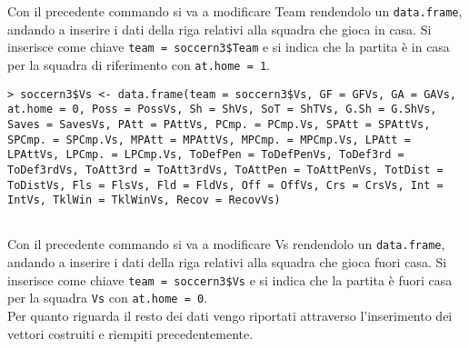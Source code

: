 \bigskip
Con il precedente commando si va a modificare \textsf{Team} rendendolo un \texttt{data.frame}, andando a inserire i dati della riga relativi alla squadra che gioca in casa. Si inserisce come chiave \texttt{team = soccern3\$Team} e si indica che la partita è in casa per la squadra di riferimento con \texttt{at.home = 1}.
\bigskip
\bigskip
\begin{lstlisting}
> soccern3$Vs <- data.frame(team = soccern3$Vs, GF = GFVs, GA = GAVs, at.home = 0, Poss = PossVs, Sh = ShVs, SoT = ShTVs, G.Sh = G.ShVs, Saves = SavesVs, PAtt = PAttVs, PCmp. = PCmp.Vs, SPAtt = SPAttVs, SPCmp. = SPCmp.Vs, MPAtt = MPAttVs, MPCmp. = MPCmp.Vs, LPAtt = LPAttVs, LPCmp. = LPCmp.Vs, ToDefPen = ToDefPenVs, ToDef3rd = ToDef3rdVs, ToAtt3rd = ToAtt3rdVs, ToAttPen = ToAttPenVs, TotDist = ToDistVs, Fls = FlsVs, Fld = FldVs, Off = OffVs, Crs = CrsVs, Int = IntVs, TklWin = TklWinVs, Recov = RecovVs)
	
\end{lstlisting}
\bigskip
Con il precedente commando si va a modificare \textsf{Vs} rendendolo un \texttt{data.frame}, andando a inserire i dati della riga relativi alla squadra che gioca fuori casa. Si inserisce come chiave \texttt{team = soccern3\$Vs} e si indica che la partita è fuori casa per la squadra \texttt{Vs} con \texttt{at.home = 0}.\\ Per quanto riguarda il resto dei dati vengo riportati attraverso l'inserimento dei vettori costruiti e riempiti precedentemente.\\
